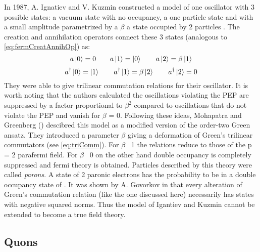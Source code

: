 In 1987, A. Ignatiev and V. Kuzmin constructed a model of one oscillator with 3 possible states: a vacuum state with no occupancy, a one particle state and with a small amplitude parametrized by a  $\beta$ a state occupied by 2 particles \cite{Ignatiev1987}. The creation and annihilation operators connect these 3 states (analogous to \ref{eq:fermCreatAnnihOp}) as:
\begin{equation}
 a \ket{0} = 0 \hspace{2em} a \ket{1} = \ket{0} \hspace{2em}  a \ket{2} = \beta \ket{1}
\end{equation} 
\begin{equation}
 a^{\dag} \ket{0} = \ket{1} \hspace{2em}  a^{\dag} \ket{1} = \beta \ket{2} \hspace{2em}  a^{\dag} \ket{2} = 0
\end{equation} 
They were able to give trilinear commutation relations for their oscillator. It is worth noting that the authors calculated the oscillations violating the PEP are suppressed by a factor proportional to $\beta^{2}$ compared to oscillations that do not violate the PEP and vanish for $\beta$ = 0. Following these ideas, Mohapatra and Greenberg (\cite{Greenberg2000}) descibred this model as a modified version of the order-two Green ansatz. They introduced a parameter $\beta$ giving a deformation of Green's trilinear commutators (see \ref{eq:triComm}). For $\beta$ \textrightarrow \ 1 the relations reduce to those of the p = 2 parafermi field. For $\beta$ \textrightarrow \ 0 on the other hand double occupancy is completely suppressed and fermi theory is obtained. Particles described by this theory were called \textit{parons}. A state of 2 paronic electrons has the probability to be in a double occupancy state of \betatwo. It was shown by A. Govorkov in \cite{Govorkov1989} that every alteration of Green's commutation relation (like the one discussed here) necessarily has states with negative squared norms. Thus the model of Igantiev and Kuzmin cannot be extended to become a true field theory.

\subsection{Quons}

